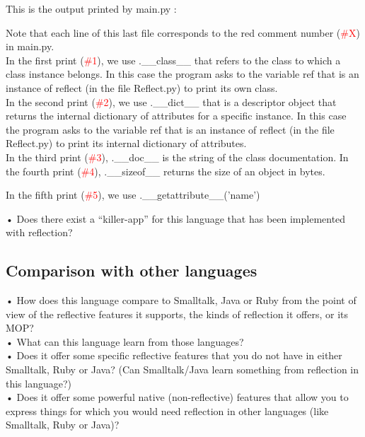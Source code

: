 This is the output printed by main.py :

Note that each line of this last file corresponds to the red comment number (\textcolor{red}{\#X}) in main.py.\\ 
In the first print (\textcolor{red}{\#1}), we use .\_\_class\_\_ that refers to the class to which a class instance belongs. In this case the program asks to the variable ref that is an instance of reflect (in the file Reflect.py) to print its own class.\\
In the second print (\textcolor{red}{\#2}), we use .\_\_dict\_\_ that is a descriptor object that returns the internal dictionary of attributes for a specific instance. In this case the program asks to the variable ref that is an instance of reflect (in the file Reflect.py) to print its internal dictionary of attributes.\\
In the third print (\textcolor{red}{\#3}), .\_\_doc\_\_ is the string of the class documentation. 
In the fourth print (\textcolor{red}{\#4}), .\_\_sizeof\_\_ returns the size of an object in bytes.

In the fifth print (\textcolor{red}{\#5}), we use .\_\_getattribute\_\_('name') 



•	Does there exist a “killer-app” for this language that has been implemented with reflection?\\

\subsection{Comparison with other languages}
•	How does this language compare to Smalltalk, Java or Ruby from the point of view of the reflective features it supports, the kinds of reflection it offers, or its MOP?\\
•	What can this language learn from those languages?\\
•	Does it offer some specific reflective features that you do not have in either Smalltalk, Ruby or Java? (Can Smalltalk/Java learn something from reflection in this language?)\\
•	Does it offer some powerful native (non-reflective) features that allow you to express things for which you would need reflection in other languages (like Smalltalk, Ruby or Java)?\\
